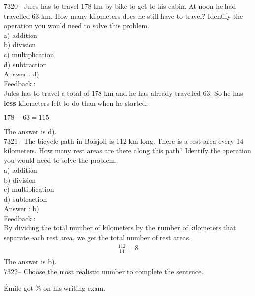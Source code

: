 \documentclass[letterpaper, 12pt]{article}
\begin{document}
7320-- Jules has to travel 178 km by bike to get to his cabin. At noon he had travelled 63 km. How many kilometers 
does he still have to travel? Identify the operation you would need to solve this problem. \\

a) addition\\
b) division\\
c) multiplication\\
d) subtraction\\

Answer : d)\\

Feedback :\\
Jules has to travel a total of 178 km and he has already travelled 63. So he has \textbf{less} kilometers left to do than when he started.

\begin{center}
$178-63 = 115$
\end{center}
The answer is d).\\




7321-- The bicycle path in Boisjoli is 112 km long. There is a rest area every 14 kilometers. How many rest areas are there along this path? Identify the operation you would need to solve the problem. \\

a) addition\\
b) division\\
c) multiplication\\
d) subtraction\\

Answer : b)\\

Feedback :\\
By dividing the total number of kilometers by the number of kilometers that separate each rest area, we get the total number of rest areas.\\

\begin{eqnarray*}
\frac{112}{14}=8\\
\end{eqnarray*}
The answer is b).\\




7322-- Choose the most realistic number to complete the sentence.\\
\begin{center}
\'Emile got \underline{\quad\quad}\% on his writing exam.\\
\end{center}
\end{document}
